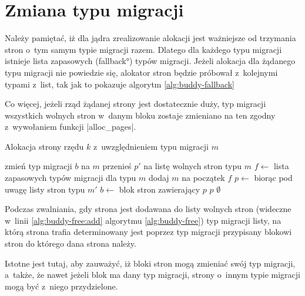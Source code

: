 \section{Zmiana typu migracji}\label{sec:type-change}

Należy pamiętać, iż dla jądra zrealizowanie alokacji jest ważniejsze
od trzymania stron o~tym samym typie migracji razem.  Dlatego dla
każdego typu migracji istnieje lista zapasowych (\ang{fallback}) typów
migracji.  Jeżeli alokacja dla żądanego typu migracji nie powiedzie
się, alokator stron będzie próbował z~kolejnymi typami z~list, tak jak
to pokazuje algorytm \ref{alg:buddy-fallback}

Co więcej, jeżeli rząd żądanej strony jest dostatecznie duży, typ
migracji wszystkich wolnych stron w~danym bloku zostaje zmieniano na
ten zgodny z~wywołaniem funkcji \code|alloc_pages|.

\begin{algorithm}
\caption[Alokacja z~uwzględnieniem typu migracji.]{Alokacja strony
  rzędu $k$ z~uwzględnieniem typu migracji $m$}
\label{alg:buddy-fallback}
\begin{algorithmic}[1]
\State zmień typ migracji $b$ na $m$
    \State przenieś $p'$ na listę wolnych stron typu $m$
\EndFor
\EndFunction
\Statex
{}
    \State $f \gets$ lista zapasowych typów migracji dla typu $m$
    \State dodaj $m$ na początek $f$
        \State $p \gets$  biorąc pod uwagę listy stron typu $m'$
                \State $b \gets$ blok stron zawierający $p$
                \State {}
            \EndIf
            \State \Return $p$
        \EndIf
    \EndFor
    \State \Return $\emptyset$
\EndFunction
\end{algorithmic}
\end{algorithm}

Podczas zwalniania, gdy strona jest dodawana do listy wolnych stron
(wideczne w~linii \ref{alg:buddy-free:add} algorytmu
\ref{alg:buddy-free}) typ migracji listy, na którą strona trafia
determinowany jest poprzez typ migracji przypisany blokowi stron do
którego dana strona należy.

Istotne jest tutaj, aby zauważyć, iż bloki stron mogą zmieniać swój
typ migracji, a~także, że nawet jeżeli blok ma dany typ migracji,
strony o~innym typie migracji mogą być z~niego przydzielone.



